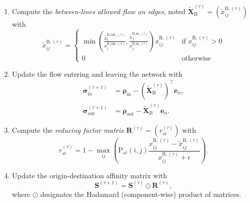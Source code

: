 \documentclass[11p]{article}
\begin{document}
\begin{enumerate}
	\item Compute the \emph{between-lines allowed flow on edges}, noted $\widetilde{\mathbf{X}}_\text{B}^{(\tau)} = (\widetilde{x}_{ij}^{\text{B},(\tau)})$ with 
	\begin{equation}
		\widetilde{x}_{ij}^{\text{B},(\tau)} = \begin{cases}
			\min \left(\frac{\tilde{x}^{\text{B,out},(\tau)}_i}{x^{\text{B,out},(\tau)}_i} , \frac{\tilde{x}^{\text{B,in},(\tau)}_j}{x^{\text{B,in},(\tau)}_j} \right)  x^{\text{B},(\tau)}_{ij} & \text{if } x^{\text{B},(\tau)}_{ij} > 0\\
			0 & \text{otherwise}
			\end{cases}
	\end{equation}
	\item Update the flow entering and leaving the network with
		\begin{align}
			\bm{\sigma}^{(\tau+1)}_\text{in} &= \bm{\rho}_\text{in} -  (\widetilde{\mathbf{X}}^{(\tau)}_\text{B})^\top \mathbf{e}_n, \\
			\bm{\sigma}^{(\tau+1)}_\text{out} &= \bm{\rho}_\text{out} -  \widetilde{\mathbf{X}}^{(\tau)}_\text{B} \mathbf{e}_n.
		\end{align}
	\item Compute the \emph{reducing factor matrix} $\mathbf{R}^{(\tau)} = (r^{(\tau)}_{st})$ with 
	\begin{equation}
		r^{(\tau)}_{st} = 1 - \max_{ij} \left( \text{P}_{st}(i, j) \frac{x_{ij}^{\text{B},(\tau)}  - \widetilde{x}_{ij}^{\text{B},(\tau)}}{x_{ij}^{\text{B},(\tau)} + \epsilon} \right).
	\end{equation}
	\item Update the origin-destination affinity matrix with
	\begin{equation}
		\mathbf{S}^{(\tau + 1)} = \mathbf{S}^{(\tau)} \odot \mathbf{R}^{(\tau)},
	\end{equation}
	where $\odot$ designates the Hadamard (component-wise) product of matrices. 
\end{enumerate}
\end{document}
